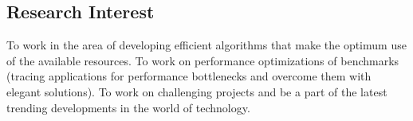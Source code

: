 \documentclass[margin]{res}
\begin{document}
 
\begin{resume} 
%
\section{Research Interest}
\mbox{} \newline
%
%
To work in the area of developing efficient algorithms that make the optimum use of the available resources. 
To work on performance optimizations of benchmarks (tracing applications for performance bottlenecks and overcome them with elegant solutions). 
To work on challenging projects and be a part of the latest trending developments in the world of technology. 
%
%
%
%
%
%

\end{resume}
\end{document}
